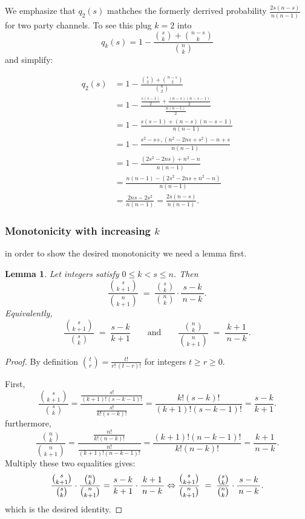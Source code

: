 \documentclass[10pt,twocolumn]{article}
\newtheorem{lemma}[theorem]{Lemma}
\begin{document}
We emphasize that $q_2(s)$ mathches the formerly derrived probability $\frac{2s(n-s)}{n(n-1)}$ for two party channels. To see this plug $k=2$ into
\[
q_k(s)=1-\frac{\binom{s}{k}+\binom{n-s}{k}}{\binom{n}{k}}
\]
and simplify:

\begin{equation}
\begin{aligned}
q_2(s)
&=1-\frac{\binom{s}{2}+\binom{n-s}{2}}{\binom{n}{2}} \\
&=1-\frac{\frac{s(s-1)}{2}+\frac{(n-s)(n-s-1)}{2}}{\frac{n(n-1)}{2}}\\
&=1-\frac{s(s-1)+(n-s)(n-s-1)}{n(n-1)}\\
&=1-\frac{s^2-s+,(n^2-2ns+s^2)-n+s}{n(n-1)}\\
&=1-\frac{(2s^2-2ns)+n^2-n}{n(n-1)}\\
&=\frac{n(n-1)-(2s^2-2ns+n^2-n)}{n(n-1)}\\
&=\frac{2ns-2s^2}{n(n-1)}
=\boxed{\frac{2s(n-s)}{n(n-1)}}.
\end{aligned}
\end{equation}

\subsubsection{Monotonicity with increasing $k$}

in order to show the desired monotonicity we need a lemma first.
\begin{lemma}\label{lem:binom-step}
Let integers satisfy $0\le k < s \le n$. Then
\[
\frac{\binom{s}{k+1}}{\binom{n}{k+1}}
\;=\;
\frac{\binom{s}{k}}{\binom{n}{k}}\cdot \frac{s-k}{\,n-k\,}.
\]
Equivalently,
\[
\frac{\binom{s}{k+1}}{\binom{s}{k}}
\;=\;
\frac{s-k}{k+1}
\qquad\text{and}\qquad
\frac{\binom{n}{k}}{\binom{n}{k+1}}
\;=\;
\frac{k+1}{\,n-k\,}.
\]
\end{lemma}

\begin{proof}
By definition $\displaystyle \binom{t}{r}=\frac{t!}{r!\,(t-r)!}$ for integers $t\ge r\ge 0$.

First,
\[
\frac{\binom{s}{k+1}}{\binom{s}{k}}
=\frac{\frac{s!}{(k+1)!(s-k-1)!}}{\frac{s!}{k!(s-k)!}}
=\frac{k!(s-k)!}{(k+1)!(s-k-1)!}
=\frac{s-k}{k+1}.
\]
furthermore,
\[
\frac{\binom{n}{k}}{\binom{n}{k+1}}
=\frac{\frac{n!}{k!(n-k)!}}{\frac{n!}{(k+1)!(n-k-1)!}}
=\frac{(k+1)!(n-k-1)!}{k!(n-k)!}
=\frac{k+1}{\,n-k\,}.
\]
Multiply these two equalities gives:
\[
\frac{\binom{s}{k+1}}{\binom{s}{k}}\cdot\frac{\binom{n}{k}}{\binom{n}{k+1}} =\frac{s-k}{k+1}\cdot \frac{k+1}{\,n-k\,} \\
\Leftrightarrow
\frac{\binom{s}{k+1}}{\binom{n}{k+1}}
\;=\;
\frac{\binom{s}{k}}{\binom{n}{k}}\cdot \frac{s-k}{\,n-k\,}.
\]
which is the desired identity.
\end{proof}
\end{document}
